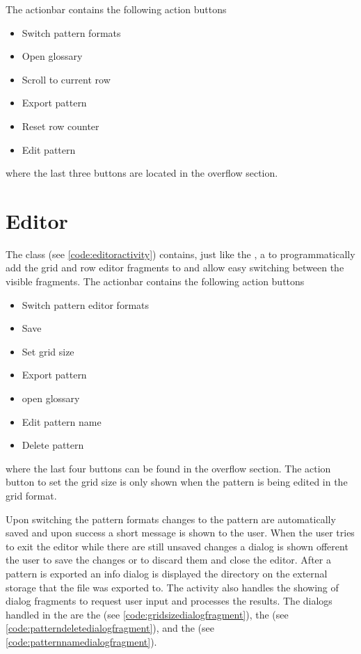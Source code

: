 The actionbar contains the following action buttons

\begin{itemize}
\item Switch pattern formats
\item Open glossary
\item Scroll to current row
\item Export pattern
\item Reset row counter
\item Edit pattern
\end{itemize}

where the last three buttons are located in the overflow section.

\section{Editor}
The class  (see \ref{code:editoractivity}) contains, just like the , a  to programmatically add the grid and row editor fragments to and allow easy switching between the visible fragments. The actionbar contains the following action buttons 

\begin{itemize}
\item Switch pattern editor formats
\item Save
\item Set grid size
\item Export pattern
\item open glossary
\item Edit pattern name
\item Delete pattern
\end{itemize}

where the last four buttons can be found in the overflow section. The action button to set the grid size is only shown when the pattern is being edited in the grid format.

Upon switching the pattern formats changes to the pattern are automatically saved and upon success a short message is shown to the user. When the user tries to exit the editor while there are still unsaved changes a dialog is shown offerent the user to save the changes or to discard them and close the editor. After a pattern is exported an info dialog is displayed the directory on the external storage that the file was exported to.
The activity also handles the showing of dialog fragments to request user input and processes the results. The dialogs handled in the  are the  (see \ref{code:gridsizedialogfragment}), the  (see \ref{code:patterndeletedialogfragment}), and the  (see \ref{code:patternnamedialogfragment}).

